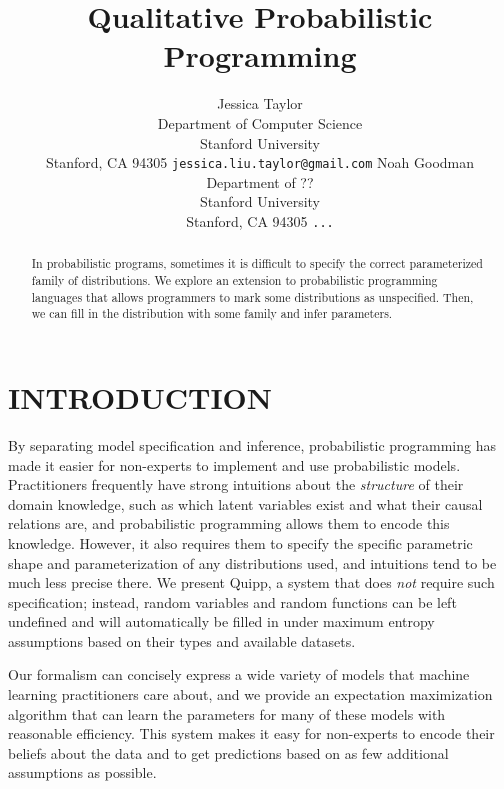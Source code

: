 \documentclass{article}
\title{Qualitative Probabilistic Programming}
\author{
Jessica Taylor \\
Department of Computer Science\\
Stanford University \\
Stanford, CA 94305
\texttt{jessica.liu.taylor@gmail.com}
\And
Noah Goodman \\
Department of ?? \\
Stanford University \\
Stanford, CA 94305
\texttt{...}
\And
}
\begin{document}
  \maketitle

  \begin{abstract}
    In probabilistic programs, sometimes it is difficult to specify the correct
    parameterized family of distributions.  We explore an extension to
    probabilistic programming languages that allows programmers to mark some
    distributions as unspecified.  Then, we can fill in the distribution with
    some family and infer parameters.
  \end{abstract}

  \section{INTRODUCTION}

  By separating model specification and inference, probabilistic programming 
  has made it easier for non-experts to implement and use probabilistic models.
  Practitioners frequently have strong intuitions about the {\em structure}
  of their domain knowledge, such as which latent variables exist and what
  their causal relations are, and probabilistic programming allows them to encode
  this knowledge. However, it also requires them to specify the specific parametric
  shape  and parameterization of any distributions used, and intuitions tend to
  be much less precise there.
  We present Quipp, a system that does {\em not} require such specification;
  instead, random variables and random functions can be left undefined
  and will automatically be filled in under maximum entropy assumptions
  based on their types and available datasets.
  
  Our formalism can concisely express a wide variety of models that machine
  learning practitioners care about, and we provide an expectation
  maximization algorithm that can learn the parameters for many of
  these models with reasonable efficiency. This system makes it easy
  for non-experts to encode their beliefs about the data and to get
  predictions based on as few additional assumptions as possible.
  
\end{document}
